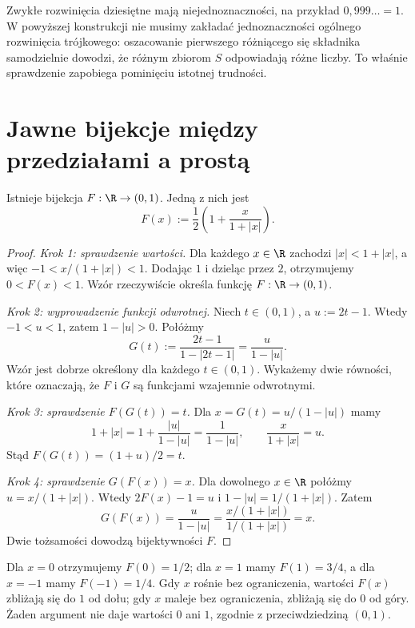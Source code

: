 \begin{uwaga}
Zwykłe rozwinięcia dziesiętne mają niejednoznaczności,
na przykład $0{,}999\ldots=1$. W powyższej konstrukcji
nie musimy zakładać jednoznaczności ogólnego rozwinięcia
trójkowego: oszacowanie pierwszego różniącego się składnika
samodzielnie dowodzi, że różnym zbiorom $S$ odpowiadają różne liczby.
To właśnie sprawdzenie zapobiega pominięciu istotnej trudności.
\end{uwaga}

\section{Jawne bijekcje między przedziałami a prostą}\label{sec:card-interval-bijections}
\begin{twierdzenie}\label{thm:card-open-interval-real}
Istnieje bijekcja $F:\R\to(0,1)$. Jedną z nich jest
\[
F(x):=\frac12\left(1+\frac{x}{1+|x|}\right).
\]
\end{twierdzenie}
\begin{proof}
\emph{Krok 1: sprawdzenie wartości.}
Dla każdego $x\in\R$ zachodzi $|x|<1+|x|$,
a więc $-1<x/(1+|x|)<1$. Dodając $1$ i dzieląc przez $2$,
otrzymujemy $0<F(x)<1$. Wzór rzeczywiście określa funkcję
$F:\R\to(0,1)$.

\emph{Krok 2: wyprowadzenie funkcji odwrotnej.}
Niech $t\in(0,1)$, a $u:=2t-1$. Wtedy $-1<u<1$, zatem
$1-|u|>0$. Połóżmy
\[
G(t):=\frac{2t-1}{1-|2t-1|}=\frac{u}{1-|u|}.
\]
Wzór jest dobrze określony dla każdego $t\in(0,1)$.
Wykażemy dwie równości, które oznaczają, że $F$ i $G$
są funkcjami wzajemnie odwrotnymi.

\emph{Krok 3: sprawdzenie $F(G(t))=t$.}
Dla $x=G(t)=u/(1-|u|)$ mamy
\[
1+|x|=1+\frac{|u|}{1-|u|}=\frac{1}{1-|u|},
\qquad \frac{x}{1+|x|}=u.
\]
Stąd $F(G(t))=(1+u)/2=t$.

\emph{Krok 4: sprawdzenie $G(F(x))=x$.}
Dla dowolnego $x\in\R$ połóżmy $u=x/(1+|x|)$.
Wtedy $2F(x)-1=u$ i
$1-|u|=1/(1+|x|)$. Zatem
\[
G(F(x))=\frac{u}{1-|u|}
=\frac{x/(1+|x|)}{1/(1+|x|)}=x.
\]
Dwie tożsamości dowodzą bijektywności $F$.
\end{proof}
\begin{przyklad}
Dla $x=0$ otrzymujemy $F(0)=1/2$; dla $x=1$ mamy
$F(1)=3/4$, a dla $x=-1$ mamy $F(-1)=1/4$.
Gdy $x$ rośnie bez ograniczenia, wartości $F(x)$
zbliżają się do $1$ od dołu; gdy $x$ maleje bez ograniczenia,
zbliżają się do $0$ od góry. Żaden argument nie daje
wartości $0$ ani $1$, zgodnie z przeciwdziedziną $(0,1)$.
\end{przyklad}

